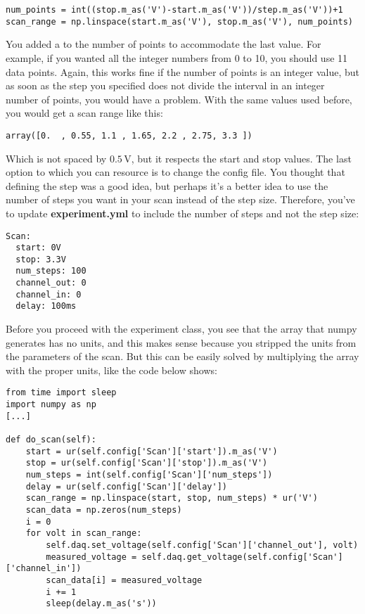 \begin{verbatim}
num_points = int((stop.m_as('V')-start.m_as('V'))/step.m_as('V'))+1
scan_range = np.linspace(start.m_as('V'), stop.m_as('V'), num_points)
\end{verbatim}

You added a  to the number of points to accommodate the last value. For example, if you wanted all the integer numbers from 0 to 10, you should use 11 data points. Again, this works fine if the number of points is an integer value, but as soon as the step you specified does not divide the interval in an integer number of points, you would have a problem. With the same values used before, you would get a scan range like this:

\begin{verbatim}
array([0.  , 0.55, 1.1 , 1.65, 2.2 , 2.75, 3.3 ])
\end{verbatim}

Which is not spaced by $0.5\,\textrm{V}$, but it respects the start and stop values. The last option to which you can resource is to change the config file. You thought that defining the step was a good idea, but perhaps it's a better idea to use the number of steps you want in your scan instead of the step size. Therefore, you've to update \textbf{experiment.yml} to include the number of steps and not the step size:

\begin{verbatim}
Scan:
  start: 0V
  stop: 3.3V
  num_steps: 100
  channel_out: 0
  channel_in: 0
  delay: 100ms
\end{verbatim}

Before you proceed with the experiment class, you see that the array that numpy generates has no units, and this makes sense because you stripped the units from the parameters of the scan. But this can be easily solved by multiplying the array with the proper units, like the code below shows:

\begin{verbatim}
from time import sleep
import numpy as np
[...]

def do_scan(self):
    start = ur(self.config['Scan']['start']).m_as('V')
    stop = ur(self.config['Scan']['stop']).m_as('V')
    num_steps = int(self.config['Scan']['num_steps'])
    delay = ur(self.config['Scan']['delay'])
    scan_range = np.linspace(start, stop, num_steps) * ur('V')
    scan_data = np.zeros(num_steps)
    i = 0
    for volt in scan_range:
        self.daq.set_voltage(self.config['Scan']['channel_out'], volt)
        measured_voltage = self.daq.get_voltage(self.config['Scan']['channel_in'])
        scan_data[i] = measured_voltage
        i += 1
        sleep(delay.m_as('s'))
\end{verbatim}

